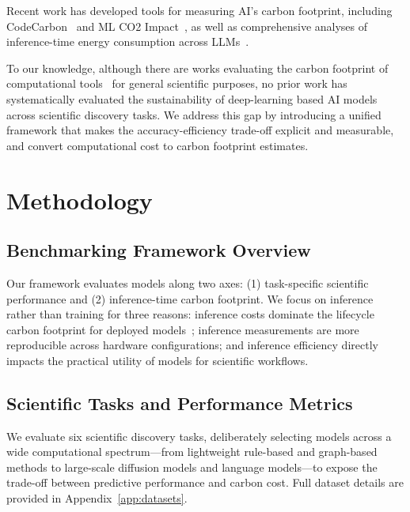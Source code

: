 \documentclass{article}
\theoremstyle{plain}
\theoremstyle{definition}
\theoremstyle{remark}
\begin{document}
Recent work has developed tools for measuring AI's carbon footprint, including CodeCarbon~\cite{codecarbon} and ML CO2 Impact~\cite{lacoste2019quantifying}, as well as comprehensive analyses of inference-time energy consumption across LLMs~\cite{luccioni2024power, jegham2025hungry}. 

To our knowledge, although there are works evaluating the carbon footprint of computational tools~\cite{lannelongue2021green} for general scientific purposes, no prior work has systematically evaluated the sustainability of deep-learning based AI models across scientific discovery tasks. We address this gap by introducing a unified framework that makes the accuracy-efficiency trade-off explicit and measurable, and convert computational cost to carbon footprint estimates.


\section{Methodology}

\subsection{Benchmarking Framework Overview}

Our framework evaluates models along two axes: (1) task-specific scientific performance and (2) inference-time carbon footprint. We focus on inference rather than training for three reasons: inference costs dominate the lifecycle carbon footprint for deployed models~\cite{patterson2022carbon}; inference measurements are more reproducible across hardware configurations; and inference efficiency directly impacts the practical utility of models for scientific workflows.

\subsection{Scientific Tasks and Performance Metrics}

We evaluate six scientific discovery tasks, deliberately selecting models across a wide computational spectrum---from lightweight rule-based and graph-based methods to large-scale diffusion models and language models---to expose the trade-off between predictive performance and carbon cost. Full dataset details are provided in Appendix~\ref{app:datasets}.
\end{document}
